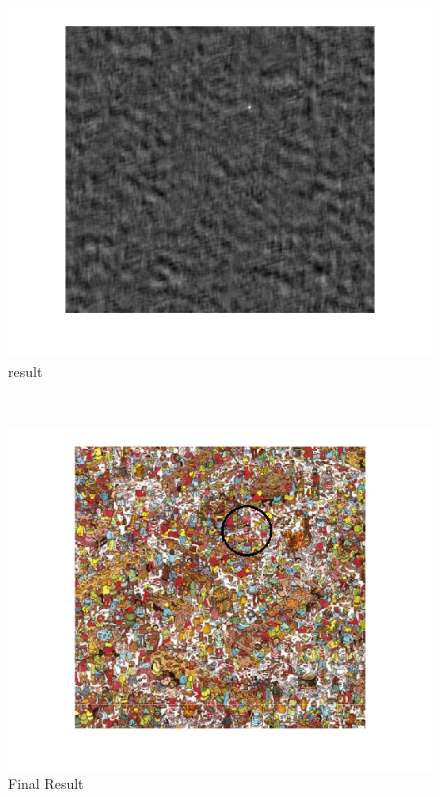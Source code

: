 \documentclass[letterpaper,11pt]{texMemo} %
\begin{document}
\begin{figure}[!h]
	\centering
		\includegraphics{result.png}
	\caption{result}
	\label{fig:result}
\end{figure}
\\
\begin{figure}
	\centering
		\includegraphics{final.png}
	\caption{Final Result}
	\label{fig:final}
\end{figure}


\end{document}
